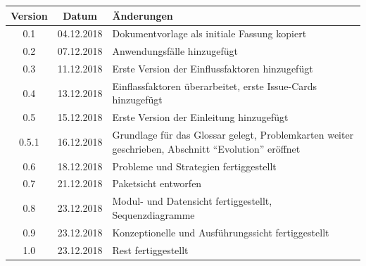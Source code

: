\documentclass[enabledeprecatedfontcommands,fontsize=12pt,paper=a4,twoside,parskip=half]{scrartcl}
\begin{document}


\newpage

  \thispagestyle{fancy}
  \fancyhead{}
  \fancyfoot{}
  \renewcommand{\headrulewidth}{0.4pt}
  \tableofcontents

\newpage







\begin{tabular}{ccp{}}
Version & Datum & Änderungen \\
\hline
0.1 & 04.12.2018 & Dokumentvorlage als initiale Fassung kopiert \\
0.2 & 07.12.2018 & Anwendungsfälle hinzugefügt \\
0.3 & 11.12.2018 & Erste Version der Einflussfaktoren hinzugefügt \\
0.4 & 13.12.2018 & Einflassfaktoren überarbeitet, erste Issue-Cards hinzugefügt \\
0.5 & 15.12.2018 & Erste Version der Einleitung hinzugefügt \\
0.5.1 & 16.12.2018 & Grundlage für das Glossar gelegt, Problemkarten weiter geschrieben, Abschnitt \enquote{Evolution} eröffnet \\
0.6 & 18.12.2018 & Probleme und Strategien fertiggestellt \\
0.7 & 21.12.2018 & Paketsicht entworfen \\
0.8 & 23.12.2018 & Modul- und Datensicht fertiggestellt, Sequenzdiagramme \\
0.9 & 23.12.2018 & Konzeptionelle und Ausführungssicht fertiggestellt \\
1.0 & 23.12.2018 & Rest fertiggestellt\\
\end{tabular}
\end{document}
